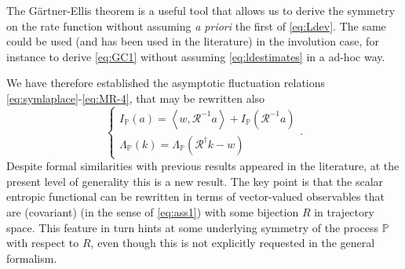 \documentclass[a4paper,11pt]{article}
\numberwithin{equation}{section}
\begin{document}
The G\"artner-Ellis theorem is a useful tool that allows us to derive the symmetry on the rate function without assuming \emph{a priori} the first of \eqref{eq:Ldev}. The same could be used (and has been used in the literature) in the involution case, for instance to derive \eqref{eq:GC1} without assuming \eqref{eq:ldestimates} in a ad-hoc way.



We have therefore established the asymptotic fluctuation relations \eqref{eq:symlaplace}-\eqref{eq:MR-4}, that may be rewritten also
 \begin{equation}
\begin{cases}\label{eq:MR}
 I_{\mathbb{P}}\left(a \right)=\left\langle w,\mathcal{R}^{-1} a \right\rangle +I_{\mathbb{P}}\left(\mathcal{R}^{-1} a \right)\\
 \Lambda_{\mathbb{P}}\left( k \right)=\Lambda_{\mathbb{P}}\left(\mathcal{R}^{\dagger} k -w\right) 
\end{cases}.
\end{equation}
Despite formal similarities with previous results appeared in the literature, at the present level of generality this is a new result. 
The key point is that the scalar entropic functional can be rewritten in terms of vector-valued observables that are (covariant) (in the sense of \eqref{eq:ass1}) with some bijection $R$ in trajectory space. This feature in turn hints at some underlying symmetry of the process $\mathbb{P}$ with respect to $R$, even though this is not explicitly requested in the general formalism. 
\end{document}
